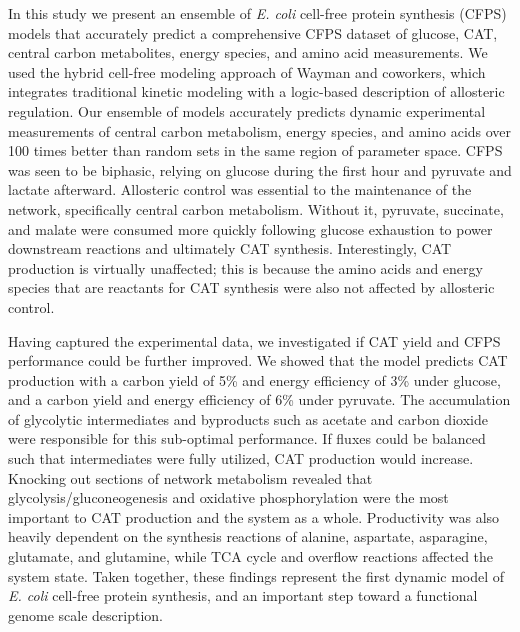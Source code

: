 \documentclass[12pt]{article}
\begin{document}
In this study we present an ensemble of \textit{E. coli} cell-free protein synthesis (CFPS) models that accurately predict a comprehensive CFPS dataset of glucose, CAT, central carbon metabolites, energy species, and amino acid measurements.
We used the hybrid cell-free modeling approach of Wayman and coworkers, which integrates traditional kinetic modeling with a logic-based description of allosteric regulation.
Our ensemble of models accurately predicts dynamic experimental measurements of central carbon metabolism, energy species, and amino acids over 100 times better than random sets in the same region of parameter space.
CFPS was seen to be biphasic, relying on glucose during the first hour and pyruvate and lactate afterward.
Allosteric control was essential to the maintenance of the network, specifically central carbon metabolism.
Without it, pyruvate, succinate, and malate were consumed more quickly following glucose exhaustion to power downstream reactions and ultimately CAT synthesis.
Interestingly, CAT production is virtually unaffected; this is because the amino acids and energy species that are reactants for CAT synthesis were also not affected by allosteric control.

Having captured the experimental data, we investigated if CAT yield and CFPS performance could be further improved.
We showed that the model predicts CAT production with a carbon yield of 5\% and energy efficiency of 3\% under glucose, and a carbon yield and energy efficiency of 6\% under pyruvate.
The accumulation of glycolytic intermediates and byproducts such as acetate and carbon dioxide were responsible for this sub-optimal performance.
If fluxes could be balanced such that intermediates were fully utilized, CAT production would increase.
Knocking out sections of network metabolism revealed that glycolysis\slash gluconeogenesis and oxidative phosphorylation were the most important to CAT production and the system as a whole.
Productivity was also heavily dependent on the synthesis reactions of alanine, aspartate, asparagine, glutamate, and glutamine, while TCA cycle and overflow reactions affected the system state.
Taken together, these findings represent the first dynamic model of \textit{E. coli} cell-free protein synthesis, and an important step toward a functional genome scale description.
\end{document}

